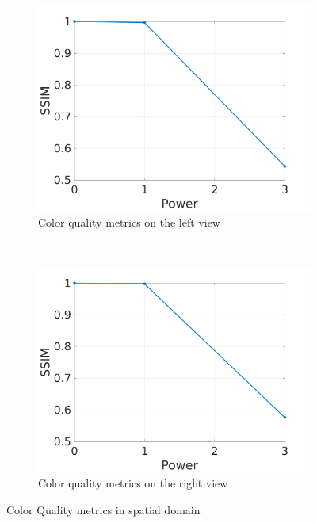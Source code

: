 \begin{figure}[h!]
    \centering
    \begin{subfigure}[t]{0.5\textwidth}
        \centering
\includegraphics[width=1\textwidth]{./img/qm_gauss/gqm_left.png}
          \caption{\small{Color quality metrics on the left view}}
\label{fig:gqmcl}

    \end{subfigure}%
    ~ 
    \begin{subfigure}[t]{0.5\textwidth}
        \centering
\includegraphics[width=1\textwidth]{./img/qm_gauss/gqm_right.png}
           \caption{\small{Color quality metrics on the right view}}
\label{fig:gqmdl}
    \end{subfigure}
    \caption{Color Quality metrics in spatial domain}
    \label{fig:gqmc}
\end{figure}

